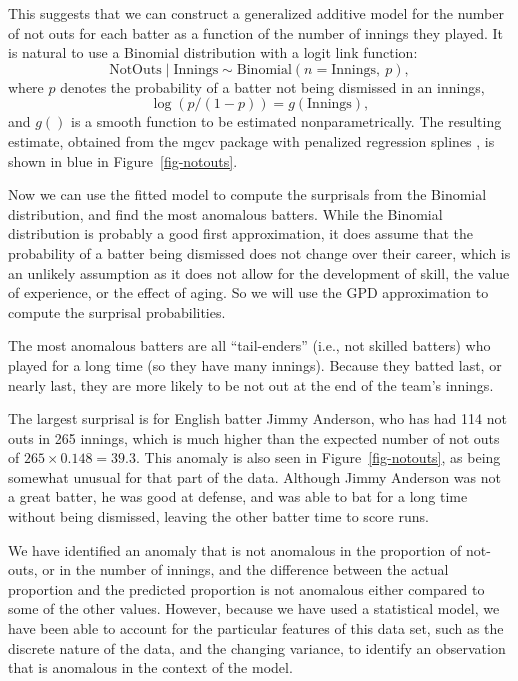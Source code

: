 \documentclass[
  12pt]{article}
\theoremstyle{definition}
\theoremstyle{plain}
\theoremstyle{plain}
\theoremstyle{plain}
\theoremstyle{remark}
\begin{document}
This suggests that we can construct a generalized additive model
\citep{Wood2017gam} for the number of not outs for each batter as a
function of the number of innings they played. It is natural to use a
Binomial distribution with a logit link function: \[
  \text{NotOuts} \mid \text{Innings} \sim \text{Binomial}(n=\text{Innings},~ p),
\] where \(p\) denotes the probability of a batter not being dismissed
in an innings, \[
  \log(p / (1- p)) = g(\text{Innings}),
\] and \(g()\) is a smooth function to be estimated nonparametrically.
The resulting estimate, obtained from the mgcv package with penalized
regression splines \citep{mgcv}, is shown in blue in
Figure~\ref{fig-notouts}.

Now we can use the fitted model to compute the surprisals from the
Binomial distribution, and find the most anomalous batters. While the
Binomial distribution is probably a good first approximation, it does
assume that the probability of a batter being dismissed does not change
over their career, which is an unlikely assumption as it does not allow
for the development of skill, the value of experience, or the effect of
aging. So we will use the GPD approximation to compute the surprisal
probabilities.

The most anomalous batters are all ``tail-enders'' (i.e., not skilled
batters) who played for a long time (so they have many innings). Because
they batted last, or nearly last, they are more likely to be not out at
the end of the team's innings.

The largest surprisal is for English batter Jimmy Anderson, who has had
114 not outs in 265 innings, which is much higher than the expected
number of not outs of \(265 \times 0.148 = 39.3\). This anomaly is also
seen in Figure~\ref{fig-notouts}, as being somewhat unusual for that
part of the data. Although Jimmy Anderson was not a great batter, he was
good at defense, and was able to bat for a long time without being
dismissed, leaving the other batter time to score runs.

We have identified an anomaly that is not anomalous in the proportion of
not-outs, or in the number of innings, and the difference between the
actual proportion and the predicted proportion is not anomalous either
compared to some of the other values. However, because we have used a
statistical model, we have been able to account for the particular
features of this data set, such as the discrete nature of the data, and
the changing variance, to identify an observation that is anomalous in
the context of the model.
\end{document}
